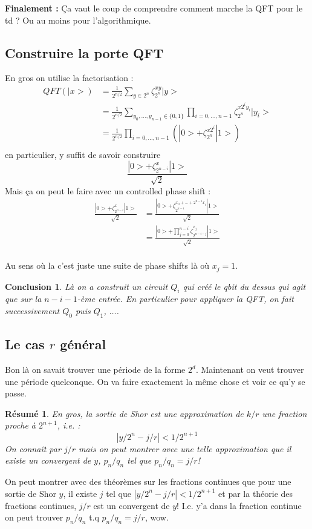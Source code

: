 \documentclass[a4paper,12pt]{book}
\theoremstyle{plain}
\newtheorem{concl}{Conclusion}
\newtheorem{res}{Résumé}
\theoremstyle{definition}
\theoremstyle{remark}
\begin{document}
\textbf{Finalement :} Ça vaut le coup de comprendre comment marche
la QFT pour le td ? Ou au moins pour l'algorithmique.

\subsection{Construire la porte QFT}
En gros on utilise la factorisation :
\begin{align*}
    QFT(|x>)&=\frac{1}{2^{n/2}}\sum_{y\in 2^n}\zeta_{2^n}^{xy}|y>\\
            &=\frac{1}{2^{n/2}}\sum_{y_0,\ldots,y_{n-1}\in \{0,1\}}
            \prod_{i=0,\ldots,{n-1}}
        \zeta_{2^n}^{x2^iy_i}|y_i>\\
            &=\frac{1}{2^{n/2}}\prod_{i=0,\ldots,n-1}(|0>+\zeta_{2^n}^{x2^i}|1>)\\
\end{align*}
en particulier, y suffit de savoir construire 
\[\frac{|0>+\zeta_{2^{n-i}}^{x}|1>}{\sqrt{2}}\]
Mais ça on peut le faire avec un controlled phase shift :
\begin{align*}
    \frac{|0>+\zeta_{2^{n-i}}^{x}|1>}{\sqrt{2}}&=\frac{|0>+\zeta_{2^{n-i}}^{x_0+\ldots+2^{n-i}x_i}|1>}{\sqrt{2}}\\
                                               &=\frac{|0>+\prod_{j=0}^{n-i}\zeta_{2^{n-i-j}}^{x_j}|1>}{\sqrt{2}}\\
\end{align*}


Au sens où la c'est juste une suite de phase shifts là où 
$x_j=1$.
\begin{concl}
    Là on a construit un circuit $Q_i$ qui créé le qbit du dessus
    qui agit que sur la $n-i-1$-ème entrée. En particulier pour
    appliquer la QFT, on fait successivement $Q_0$ puis $Q_1$, $\ldots$.
\end{concl}
\subsection{Le cas $r$ général}
Bon là on savait trouver une période de la forme $2^d$. Maintenant
on veut trouver une période quelconque. On va faire exactement
la même chose et voir ce qu'y se passe.
\begin{res}
    En gros, la sortie de Shor est une approximation de $k/r$ une 
    fraction proche à $2^{n+1}$, i.e. :
    \[|y/2^n - j/r|<1/2^{n+1}\]
    On connaît par $j/r$ mais on peut montrer avec une telle 
    approximation que il existe un convergent de $y$, $p_n/q_n$ tel
    que $p_n/q_n = j/r$!
\end{res}
On peut montrer avec des théorèmes sur les fractions continues que 
pour une sortie de Shor $y$, il existe $j$ tel que 
$|y/2^n-j/r|<1/2^{n+1}$ et par la théorie des fractions continues, $j/r$
est un convergent de $y$! I.e. y'a dans la fraction continue on peut
trouver $p_n/q_n$ t.q $p_n/q_n=j/r$, wow.
\end{document}
